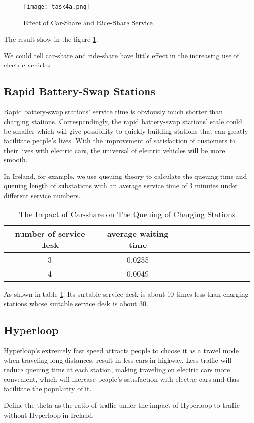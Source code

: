 \documentclass{mcmthesis}
\begin{document}
\begin{figure}[!h]
\small
\centering
\texttt{[image: task4a.png]}
\caption{Effect of Car-Share and Ride-Share Service} \label{fig:Effect of Car-Share and Ride-Share Service}
\end{figure}

\par The result show in the figure \ref{fig:Effect of Car-Share and Ride-Share Service}.
\par We could tell car-share and ride-share have little effect in the increasing use of electric vehicles.


\subsection*{Rapid Battery-Swap Stations}

\par Rapid battery-swap stations' service time is obviously much shorter than charging stations. Correspondingly, the rapid battery-swap stations' scale could be smaller which will give possibility to quickly building stations that can greatly facilitate people's lives. With the improvement of satisfaction of customers to their lives with electric cars, the universal of electric vehicles will be more smooth.

\par In Ireland, for example, we use queuing theory to calculate the queuing time and queuing length of substations with an average service time of 3 minutes under different service numbers.

\begin{table}[h]
\centering
\caption{The Impact of Car-share on The Queuing of Charging Stations}\label{tab:The Impact of Car-share on The Queuing of Charging Stations}
\begin{tabular}{ccccccccccc}
\toprule
 number of service desk & average waiting time\\
\midrule
3 & 0.0255 \\
4 & 0.0049 \\
\bottomrule
\end{tabular}
\end{table}


As shown in table \ref{tab:The Impact of Car-share on The Queuing of Charging Stations}. Its suitable service desk is about 10 times less than charging stations whose suitable service desk is about 30.


\subsection*{Hyperloop}
\par Hyperloop's extremely fast speed attracts people to choose it as a travel mode when traveling long distances, result in less cars in highway. Less traffic will reduce queuing time at each station, making traveling on electric cars more convenient, which will increase people's satisfaction with electric cars and thus facilitate the popularity of it.
\par Define the theta as the ratio of  traffic under the impact of Hyperloop to traffic without Hyperloop in Ireland. 
\end{document}
